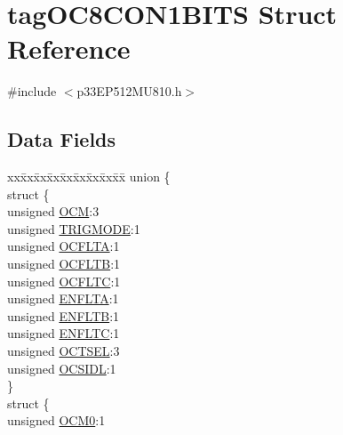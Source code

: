 \hypertarget{structtag_o_c8_c_o_n1_b_i_t_s}{}\section{tag\+O\+C8\+C\+O\+N1\+B\+I\+TS Struct Reference}
\label{structtag_o_c8_c_o_n1_b_i_t_s}


{\ttfamily \#include $<$p33\+E\+P512\+M\+U810.\+h$>$}

\subsection*{Data Fields}
\begin{DoxyCompactItemize}
\item 
\begin{tabbing}
xx\=xx\=xx\=xx\=xx\=xx\=xx\=xx\=xx\=\kill
union \{\\
\>struct \{\\
\>\>unsigned \hyperlink{structtag_o_c8_c_o_n1_b_i_t_s_a778fa0cf51a9477ac4e82d71a8733801}{OCM}:3\\
\>\>unsigned \hyperlink{structtag_o_c8_c_o_n1_b_i_t_s_a7a0057e0dca6e2663584b5b9e1da04c3}{TRIGMODE}:1\\
\>\>unsigned \hyperlink{structtag_o_c8_c_o_n1_b_i_t_s_acc967e41cecdeedc6ad4422f9ef1a6a3}{OCFLTA}:1\\
\>\>unsigned \hyperlink{structtag_o_c8_c_o_n1_b_i_t_s_a1fb30bb4421ef7c4bd0c66c379875593}{OCFLTB}:1\\
\>\>unsigned \hyperlink{structtag_o_c8_c_o_n1_b_i_t_s_a69a1772a4144abd579d17d28445b9934}{OCFLTC}:1\\
\>\>unsigned \hyperlink{structtag_o_c8_c_o_n1_b_i_t_s_a1e0f05fb23d516e003e4713fe8c1498a}{ENFLTA}:1\\
\>\>unsigned \hyperlink{structtag_o_c8_c_o_n1_b_i_t_s_a9d7aa97d5328b8b81ab7fd9145dfa0fc}{ENFLTB}:1\\
\>\>unsigned \hyperlink{structtag_o_c8_c_o_n1_b_i_t_s_a0b6f25c0f83f33b5501b6a2e6141a6ef}{ENFLTC}:1\\
\>\>unsigned \hyperlink{structtag_o_c8_c_o_n1_b_i_t_s_ae37d2a41dae2d2af1d82f7caae33cadb}{OCTSEL}:3\\
\>\>unsigned \hyperlink{structtag_o_c8_c_o_n1_b_i_t_s_afd05f4f249db4ef69b684e2f3fa6b703}{OCSIDL}:1\\
\>\} \\
\>struct \{\\
\>\>unsigned \hyperlink{structtag_o_c8_c_o_n1_b_i_t_s_a9271e84c9759ff10a7bc1cee3276e8f6}{OCM0}:1\\

\end{tabbing}
\end{DoxyCompactItemize}
